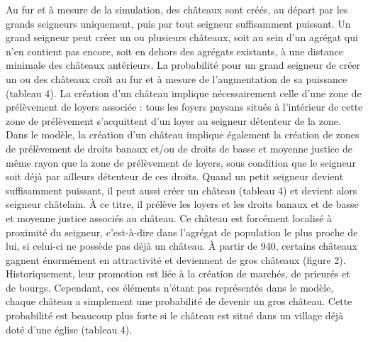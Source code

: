 \documentclass[12pt, a4paper, oneside]{book}
\begin{document}
	Au fur et à mesure de la simulation, des châteaux sont créés, au départ par les grands seigneurs uniquement, puis par tout seigneur suffisamment puissant.
	Un grand seigneur peut créer un ou plusieurs châteaux, soit au sein d'un agrégat qui n'en contient pas encore, soit en dehors des agrégats existants, à une distance minimale des châteaux antérieurs.
	La probabilité pour un grand seigneur de créer un ou des châteaux croît au fur et à mesure de l'augmentation de sa puissance (tableau 4).
	La création d'un château implique nécessairement celle d'une zone de prélèvement de loyers associée :
	tous les foyers paysans situés à l'intérieur de cette zone de prélèvement s'acquittent d'un loyer au seigneur détenteur de la zone.
	Dans le modèle, la création d'un château implique également la création de zones de prélèvement de droits banaux et/ou de droits de basse et moyenne justice de même rayon que la zone de prélèvement de loyers, sous condition que le seigneur soit déjà par ailleurs détenteur de ces droits.
	Quand un petit seigneur devient suffisamment puissant, il peut aussi créer un château (tableau 4) et devient alors seigneur châtelain.
	À ce titre, il prélève les loyers et les droits banaux et de basse et moyenne justice associés au château.
	Ce château est forcément localisé à proximité du seigneur, c'est-à-dire dans l'agrégat de population le plus proche de lui, si celui-ci ne possède pas déjà un château.
	À partir de 940, certains châteaux gagnent énormément en attractivité et deviennent de gros châteaux (figure 2).
	Historiquement, leur promotion est liée à la création de marchés, de prieurés et de bourgs.
	Cependant, ces éléments n'étant pas représentés dans le modèle, chaque château a simplement une probabilité de devenir un gros château.
	Cette probabilité est beaucoup plus forte si le château est situé dans un village déjà doté d'une église (tableau 4).
	
\end{document}
